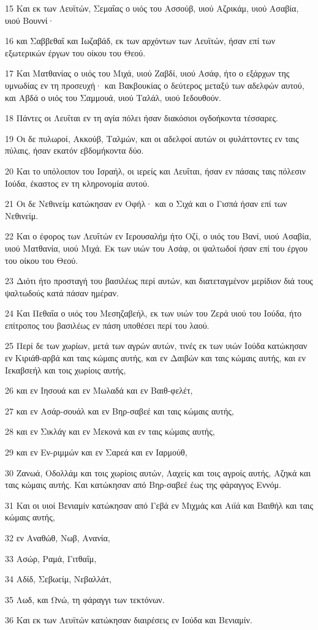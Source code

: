 \par 15 Και εκ των Λευϊτών, Σεμαΐας ο υιός του Ασσούβ, υιού Αζρικάμ, υιού Ασαβία, υιού Βουννί·
\par 16 και Σαββεθαΐ και Ιωζαβάδ, εκ των αρχόντων των Λευϊτών, ήσαν επί των εξωτερικών έργων του οίκου του Θεού.
\par 17 Και Ματθανίας ο υιός του Μιχά, υιού Ζαβδί, υιού Ασάφ, ήτο ο εξάρχων της υμνωδίας εν τη προσευχή· και Βακβουκίας ο δεύτερος μεταξύ των αδελφών αυτού, και Αβδά ο υιός του Σαμμουά, υιού Ταλάλ, υιού Ιεδουθούν.
\par 18 Πάντες οι Λευΐται εν τη αγία πόλει ήσαν διακόσιοι ογδοήκοντα τέσσαρες.
\par 19 Οι δε πυλωροί, Ακκούβ, Ταλμών, και οι αδελφοί αυτών οι φυλάττοντες εν ταις πύλαις, ήσαν εκατόν εβδομήκοντα δύο.
\par 20 Και το υπόλοιπον του Ισραήλ, οι ιερείς και Λευΐται, ήσαν εν πάσαις ταις πόλεσιν Ιούδα, έκαστος εν τη κληρονομία αυτού.
\par 21 Οι δε Νεθινείμ κατώκησαν εν Οφήλ· και ο Σιχά και ο Γισπά ήσαν επί των Νεθινείμ.
\par 22 Και ο έφορος των Λευΐτών εν Ιερουσαλήμ ήτο Οζί, ο υιός του Βανί, υιού Ασαβία, υιού Ματθανία, υιού Μιχά. Εκ των υιών του Ασάφ, οι ψαλτωδοί ήσαν επί του έργου του οίκου του Θεού.
\par 23 Διότι ήτο προσταγή του βασιλέως περί αυτών, και διατεταγμένον μερίδιον διά τους ψαλτωδούς κατά πάσαν ημέραν.
\par 24 Και Πεθαΐα ο υιός του Μεσηζαβεήλ, εκ των υιών του Ζερά υιού του Ιούδα, ήτο επίτροπος του βασιλέως εν πάση υποθέσει περί του λαού.
\par 25 Περί δε των χωρίων, μετά των αγρών αυτών, τινές εκ των υιών Ιούδα κατώκησαν εν Κιριάθ-αρβά και ταις κώμαις αυτής, και εν Δαιβών και ταις κώμαις αυτής, και εν Ιεκαβσεήλ και τοις χωρίοις αυτής,
\par 26 και εν Ιησουά και εν Μωλαδά και εν Βαιθ-φελέτ,
\par 27 και εν Ασάρ-σουάλ και εν Βηρ-σαβεέ και ταις κώμαις αυτής,
\par 28 και εν Σικλάγ και εν Μεκονά και εν ταις κώμαις αυτής,
\par 29 και εν Εν-ριμμών και εν Σαρεά και εν Ιαρμούθ,
\par 30 Ζανωά, Οδολλάμ και τοις χωρίοις αυτών, Λαχείς και τοις αγροίς αυτής, Αζηκά και ταις κώμαις αυτής. Και κατώκησαν από Βηρ-σαβεέ έως της φάραγγος Εννόμ.
\par 31 Και οι υιοί Βενιαμίν κατώκησαν από Γεβά εν Μιχμάς και Αιϊά και Βαιθήλ και ταις κώμαις αυτής,
\par 32 εν Αναθώθ, Νωβ, Ανανία,
\par 33 Ασώρ, Ραμά, Γιτθαΐμ,
\par 34 Αδίδ, Σεβωείμ, Νεβαλλάτ,
\par 35 Λωδ, και Ωνώ, τη φάραγγι των τεκτόνων.
\par 36 Και εκ των Λευϊτών κατώκησαν διαιρέσεις εν Ιούδα και Βενιαμίν.

